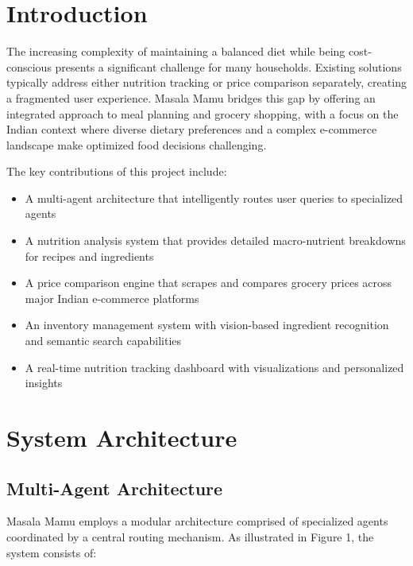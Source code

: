 \documentclass{ecai}
\begin{document}
\begin{frontmatter}
\begin{abstract}
\end{abstract}

\end{frontmatter}

\section{Introduction}

The increasing complexity of maintaining a balanced diet while being cost-conscious presents a significant challenge for many households. Existing solutions typically address either nutrition tracking or price comparison separately, creating a fragmented user experience. Masala Mamu bridges this gap by offering an integrated approach to meal planning and grocery shopping, with a focus on the Indian context where diverse dietary preferences and a complex e-commerce landscape make optimized food decisions challenging.

The key contributions of this project include:
\begin{itemize}[noitemsep,topsep=0pt]
    \item A multi-agent architecture that intelligently routes user queries to specialized agents
    \item A nutrition analysis system that provides detailed macro-nutrient breakdowns for recipes and ingredients
    \item A price comparison engine that scrapes and compares grocery prices across major Indian e-commerce platforms
    \item An inventory management system with vision-based ingredient recognition and semantic search capabilities
    \item A real-time nutrition tracking dashboard with visualizations and personalized insights
\end{itemize}

\section{System Architecture}

\subsection{Multi-Agent Architecture}

Masala Mamu employs a modular architecture comprised of specialized agents coordinated by a central routing mechanism. As illustrated in Figure 1, the system consists of:
\end{document}
